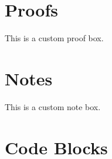 \documentclass[openany]{book}
\begin{document}
\section{Proofs}
\begin{myproof}
This is a custom proof box.
\end{myproof}

\section{Notes}
\begin{mynote}
This is a custom note box.
\end{mynote}

\section{Code Blocks}
\end{document}
